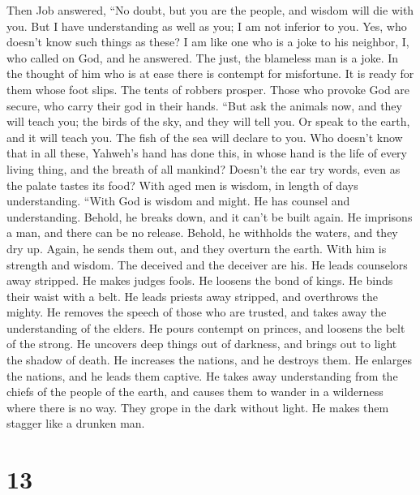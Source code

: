  Then Job answered,  ``No doubt, but you are
the people, and wisdom will die with you.  But I have
understanding as well as you; I am not inferior to you. Yes, who doesn't
know such things as these?  I am like one who is a joke to
his neighbor, I, who called on God, and he answered. The just, the
blameless man is a joke.  In the thought of him who is at
ease there is contempt for misfortune. It is ready for them whose foot
slips.  The tents of robbers prosper. Those who provoke
God are secure, who carry their god in their hands.  ``But
ask the animals now, and they will teach you; the birds of the sky, and
they will tell you.  Or speak to the earth, and it will
teach you. The fish of the sea will declare to you.  Who
doesn't know that in all these, Yahweh's hand has done this,
 in whose hand is the life of every living thing, and the
breath of all mankind?  Doesn't the ear try words, even
as the palate tastes its food?  With aged men is wisdom,
in length of days understanding.  ``With God is wisdom
and might. He has counsel and understanding.  Behold, he
breaks down, and it can't be built again. He imprisons a man, and there
can be no release.  Behold, he withholds the waters, and
they dry up. Again, he sends them out, and they overturn the earth.
 With him is strength and wisdom. The deceived and the
deceiver are his.  He leads counselors away stripped. He
makes judges fools.  He loosens the bond of kings. He
binds their waist with a belt.  He leads priests away
stripped, and overthrows the mighty.  He removes the
speech of those who are trusted, and takes away the understanding of the
elders.  He pours contempt on princes, and loosens the
belt of the strong.  He uncovers deep things out of
darkness, and brings out to light the shadow of death. 
He increases the nations, and he destroys them. He enlarges the nations,
and he leads them captive.  He takes away understanding
from the chiefs of the people of the earth, and causes them to wander in
a wilderness where there is no way.  They grope in the
dark without light. He makes them stagger like a drunken man.

\hypertarget{section-12}{%
\section{13}\label{section-12}}


